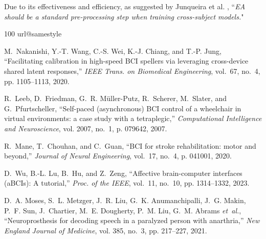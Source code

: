 \documentclass[journal]{IEEEtran}
\begin{document}
Due to its effectiveness and efficiency, as suggested by Junqueira et al. \cite{Junqueira2024}, ``\emph{EA should be a standard pre-processing step when training cross-subject models.}"


%

\begin{thebibliography}{100}
\providecommand{\url}[1]{#1}
\csname url@samestyle\endcsname
\providecommand{\newblock}{\relax}
\providecommand{\bibinfo}[2]{#2}
\providecommand{\BIBentrySTDinterwordspacing}{\spaceskip=0pt\relax}
\providecommand{\BIBentryALTinterwordstretchfactor}{4}
\providecommand{\BIBentryALTinterwordspacing}{\spaceskip=\fontdimen2\font plus
\BIBentryALTinterwordstretchfactor\fontdimen3\font minus
  \fontdimen4\font\relax}
\providecommand{\BIBforeignlanguage}[2]{{%
\expandafter\ifx\csname l@#1\endcsname\relax
\typeout{** WARNING: IEEEtran.bst: No hyphenation pattern has been}%
\typeout{** loaded for the language `#1'. Using the pattern for}%
\typeout{** the default language instead.}%
\else
\language=\csname l@#1\endcsname
\fi
#2}}
\providecommand{\BIBdecl}{\relax}
\BIBdecl

M.~Nakanishi, Y.-T. Wang, C.-S. Wei, K.-J. Chiang, and T.-P. Jung,
  ``Facilitating calibration in high-speed {BCI} spellers via leveraging
  cross-device shared latent responses,'' \emph{IEEE Trans. on Biomedical
  Engineering}, vol.~67, no.~4, pp. 1105--1113, 2020.

R.~Leeb, D.~Friedman, G.~R. M{\"u}ller-Putz, R.~Scherer, M.~Slater, and
  G.~Pfurtscheller, ``Self-paced (asynchronous) {BCI} control of a wheelchair
  in virtual environments: a case study with a tetraplegic,''
  \emph{Computational Intelligence and Neuroscience}, vol. 2007, no.~1, p.
  079642, 2007.

R.~Mane, T.~Chouhan, and C.~Guan, ``{BCI} for stroke rehabilitation: motor and
  beyond,'' \emph{Journal of Neural Engineering}, vol.~17, no.~4, p. 041001,
  2020.

D.~Wu, B.-L. Lu, B.~Hu, and Z.~Zeng, ``Affective brain-computer interfaces
  ({aBCIs}): A tutorial,'' \emph{Proc. of the IEEE}, vol.~11, no.~10, pp.
  1314--1332, 2023.

D.~A. Moses, S.~L. Metzger, J.~R. Liu, G.~K. Anumanchipalli, J.~G. Makin, P.~F.
  Sun, J.~Chartier, M.~E. Dougherty, P.~M. Liu, G.~M. Abrams \emph{et~al.},
  ``Neuroprosthesis for decoding speech in a paralyzed person with anarthria,''
  \emph{New England Journal of Medicine}, vol. 385, no.~3, pp. 217--227, 2021.


\end{thebibliography}
\end{document}
